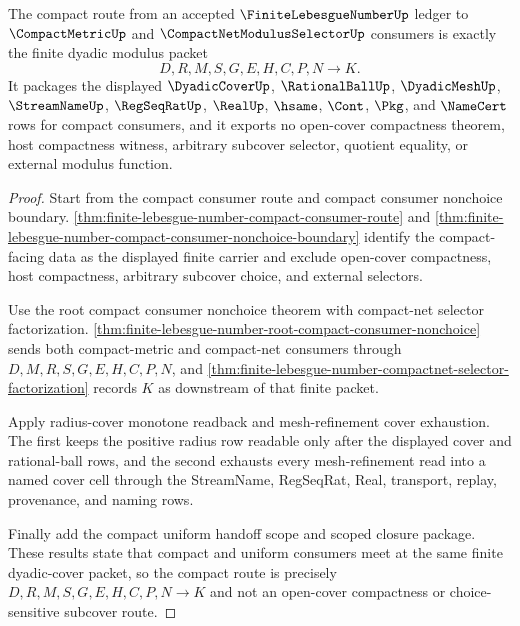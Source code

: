 \begin{theorem}
\label{thm:finite-lebesgue-number-compact-route-dyadic-modulus-package}
The compact route from an accepted $\FiniteLebesgueNumberUp$ ledger to $\CompactMetricUp$ and $\CompactNetModulusSelectorUp$ consumers is exactly the finite dyadic modulus packet
$$
D,R,M,S,G,E,H,C,P,N \to K .
$$
It packages the displayed $\DyadicCoverUp$, $\RationalBallUp$, $\DyadicMeshUp$, $\StreamNameUp$, $\RegSeqRatUp$, $\RealUp$, $\hsame$, $\Cont$, $\Pkg$, and $\NameCert$ rows for compact consumers, and it exports no open-cover compactness theorem, host compactness witness, arbitrary subcover selector, quotient equality, or external modulus function.
\end{theorem}
\begin{proof}
Start from the compact consumer route and compact consumer nonchoice boundary. \autoref{thm:finite-lebesgue-number-compact-consumer-route} and \autoref{thm:finite-lebesgue-number-compact-consumer-nonchoice-boundary} identify the compact-facing data as the displayed finite carrier and exclude open-cover compactness, host compactness, arbitrary subcover choice, and external selectors.

Use the root compact consumer nonchoice theorem with compact-net selector factorization. \autoref{thm:finite-lebesgue-number-root-compact-consumer-nonchoice} sends both compact-metric and compact-net consumers through $D,M,R,S,G,E,H,C,P,N$, and \autoref{thm:finite-lebesgue-number-compactnet-selector-factorization} records $K$ as downstream of that finite packet.

Apply radius-cover monotone readback and mesh-refinement cover exhaustion. The first keeps the positive radius row readable only after the displayed cover and rational-ball rows, and the second exhausts every mesh-refinement read into a named cover cell through the StreamName, RegSeqRat, Real, transport, replay, provenance, and naming rows.

Finally add the compact uniform handoff scope and scoped closure package. These results state that compact and uniform consumers meet at the same finite dyadic-cover packet, so the compact route is precisely $D,R,M,S,G,E,H,C,P,N \to K$ and not an open-cover compactness or choice-sensitive subcover route.
\end{proof}

